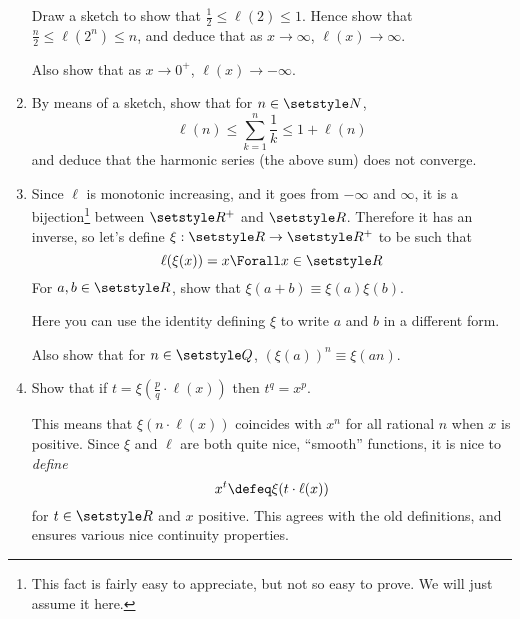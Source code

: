 \begin{enumerate}
  Draw a sketch to show that \(\frac 12 \le \ell(2) \le 1\). Hence show that
  \(\frac n2 \le \ell(2^n) \le n\), and deduce that as \(x \to \infty\),
  \(\ell(x) \to \infty\).

  Also show that as \(x \to 0^+\), \(\ell(x) \to -\infty\).
 \item
  By means of a sketch, show that for \(n \in \Naturals\),
  \begin{equation*}
   \ell(n) \le \sum_{k = 1}^n \frac 1k \le 1 + \ell(n)
  \end{equation*}
  and deduce that the harmonic series (the above sum) does not converge.
 \item
  Since \(\ell\) is monotonic increasing, and it goes from \(-\infty\) and
  \(\infty\), it is a bijection\footnote{
   This fact is fairly easy to appreciate, but not so easy to prove. We will
   just assume it here.
  } between \(\Reals^+\) and \(\Reals\). Therefore
  it has an inverse, so let's define \(\xi: \Reals \to \Reals^+\) to be such
  that
  \begin{equation*}
   \ell(\xi(x)) = x \Forall x \in \Reals
  \end{equation*}
  For \(a, b \in \Reals\), show that \(\xi(a + b) \equiv \xi(a) \xi(b)\).

  Here you can use the identity defining \(\xi\) to write \(a\) and \(b\) in a
  different form.

  Also show that for \(n \in \Rationals\), \((\xi(a))^n \equiv \xi(an)\).
 \item
  Show that if \(t = \xi(\frac pq \cdot \ell(x))\) then \(t^q = x^p\).

  This means that \(\xi(n \cdot \ell(x))\) coincides with \(x^n\) for all
  rational \(n\) when \(x\) is positive. Since \(\xi\) and \(\ell\) are both
  quite nice, ``smooth'' functions, it is nice to \emph{define}
  \begin{equation*}
   x^t \defeq \xi(t \cdot \ell(x))
  \end{equation*}
  for \(t \in \Reals\) and \(x\) positive. This agrees with the old definitions,
  and ensures various nice continuity properties.


\end{enumerate}

